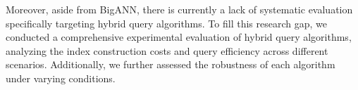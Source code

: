 \documentclass[sigconf, nonacm]{acmart}
\begin{document}
\begin{sloppypar}
Moreover, aside from BigANN, there is currently a lack of systematic evaluation specifically targeting hybrid query algorithms. To fill this research gap, we conducted a comprehensive experimental evaluation of hybrid query algorithms, analyzing the index construction costs and query efficiency across different scenarios. Additionally, we further assessed the robustness of each algorithm under varying conditions.






\end{sloppypar}
\end{document}
